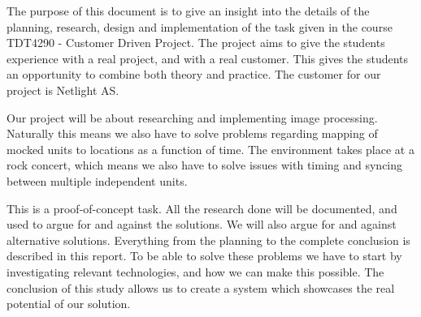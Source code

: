 The purpose of this document is to give an insight into the details of the planning, research, design and implementation of the task given in the course TDT4290 - Customer Driven Project. 
The project aims to give the students experience with a real project, and with a real customer. 
This gives the students an opportunity to combine both theory and practice. 
The customer for our project is Netlight AS.  

Our project will be about researching and implementing image processing. 
Naturally this means we also have to solve problems regarding mapping of mocked units to locations as a function of time. 
The environment takes place at a rock concert, which means we also have to solve issues with timing and syncing between multiple independent units.

This is a proof-of-concept task.  
All the research done will be documented, and used to argue for and against the solutions. 
We will also argue for and against alternative solutions. Everything from the planning to the complete conclusion is described in this report. 
To be able to solve these problems we have to start by investigating relevant technologies, and how we can make this possible.
The conclusion of this study allows us to create a system which showcases the real potential of our solution.
